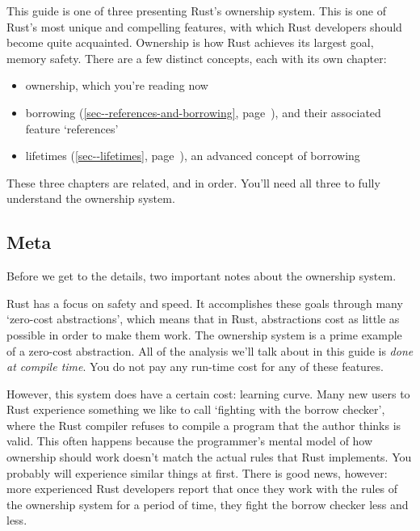 \documentclass[a4paper,]{book}
\renewcommand*{\hyperref}[2][\ar]{%
  \def\ar{#2}%
  #2 (\autoref{#1}, page~\pageref{#1})}
\providecommand{\tightlist}{%
  \setlength{\itemsep}{0pt}\setlength{\parskip}{0pt}}
\begin{document}

This guide is one of three presenting Rust's ownership system. This is
one of Rust's most unique and compelling features, with which Rust
developers should become quite acquainted. Ownership is how Rust
achieves its largest goal, memory safety. There are a few distinct
concepts, each with its own chapter:

\begin{itemize}
\tightlist
\item
  ownership, which you're reading now
\item
  \hyperref[sec--references-and-borrowing]{borrowing}, and their
  associated feature `references'
\item
  \hyperref[sec--lifetimes]{lifetimes}, an advanced concept of borrowing
\end{itemize}

These three chapters are related, and in order. You'll need all three to
fully understand the ownership system.

\subsection{Meta}\label{meta}

Before we get to the details, two important notes about the ownership
system.

Rust has a focus on safety and speed. It accomplishes these goals
through many `zero-cost abstractions', which means that in Rust,
abstractions cost as little as possible in order to make them work. The
ownership system is a prime example of a zero-cost abstraction. All of
the analysis we'll talk about in this guide is \emph{done at compile
time}. You do not pay any run-time cost for any of these features.

However, this system does have a certain cost: learning curve. Many new
users to Rust experience something we like to call `fighting with the
borrow checker', where the Rust compiler refuses to compile a program
that the author thinks is valid. This often happens because the
programmer's mental model of how ownership should work doesn't match the
actual rules that Rust implements. You probably will experience similar
things at first. There is good news, however: more experienced Rust
developers report that once they work with the rules of the ownership
system for a period of time, they fight the borrow checker less and
less.
\end{document}
